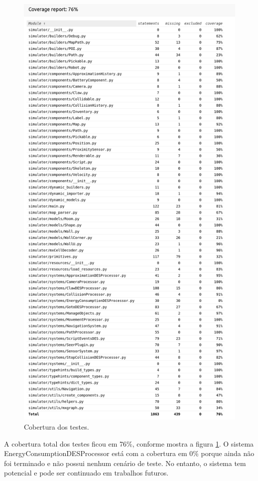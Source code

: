 \begin{figure}
\centering
\includegraphics[scale=0.4]{imagens/coverage.png}
\caption{Cobertura dos testes.} 
\label{fig:coverage}
\end{figure}

A cobertura total dos testes ficou em 76\%, conforme mostra a figura \ref{fig:coverage}.
O sistema EnergyConsumptionDESProcessor está com a cobertura em 0\% porque ainda não foi terminado e não possui nenhum cenário de teste. No entanto, o sistema tem potencial e pode ser continuado em trabalhos futuros.

